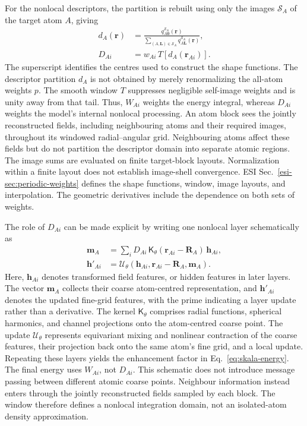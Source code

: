 \documentclass[10pt,a4paper,twocolumn]{article}
\begin{document}
For the nonlocal descriptors, the partition is rebuilt using only the images $\mathcal S_A$ of the target atom $A$, giving
\begin{equation}
 \begin{aligned}
 d_A(\mathbf r)&=\frac{q^{\mathcal S_A}_{A\mathbf0}(\mathbf r)}
 {\sum_{(A,\mathbf L)\in\mathcal S_A}q^{\mathcal S_A}_{A\mathbf L}(\mathbf r)},\\
 D_{Ai}&=w_{Ai}\,T\!\left[d_A(\mathbf r_{Ai})\right].
 \end{aligned}
 \label{eq:descriptor-weights}
\end{equation}
The superscript identifies the centres used to construct the shape functions. The descriptor partition $d_A$ is not obtained by merely renormalizing the all-atom weights $p$. The smooth window $T$ suppresses negligible self-image weights and is unity away from that tail. Thus, $W_{Ai}$ weights the energy integral, whereas $D_{Ai}$ weights the model's internal nonlocal processing. An atom block sees the jointly reconstructed fields, including neighbouring atoms and their required images, throughout its windowed radial--angular grid. Neighbouring atoms affect these fields but do not partition the descriptor domain into separate atomic regions. The image sums are evaluated on finite target-block layouts. Normalization within a finite layout does not establish image-shell convergence. ESI Sec.~\ref{esi-sec:periodic-weights} defines the shape functions, window, image layouts, and interpolation. The geometric derivatives include the dependence on both sets of weights.

The role of $D_{Ai}$ can be made explicit by writing one nonlocal layer schematically as\cite{Skala2025}
\begin{equation}
 \begin{aligned}
 \mathbf m_A&=\sum_i D_{Ai}\,
     \mathsf K_\theta(\mathbf r_{Ai}-\mathbf R_A)\,\mathbf h_{Ai},\\
 \mathbf h'_{Ai}&=\mathcal U_\theta\!\left(
     \mathbf h_{Ai},\mathbf r_{Ai}-\mathbf R_A,\mathbf m_A\right).
 \end{aligned}
 \label{eq:nonlocal-layer}
\end{equation}
Here, $\mathbf h_{Ai}$ denotes transformed field features, or hidden features in later layers. The vector $\mathbf m_A$ collects their coarse atom-centred representation, and $\mathbf h'_{Ai}$ denotes the updated fine-grid features, with the prime indicating a layer update rather than a derivative. The kernel $\mathsf K_\theta$ comprises radial functions, spherical harmonics, and channel projections onto the atom-centred coarse point. The update $\mathcal U_\theta$ represents equivariant mixing and nonlinear contraction of the coarse features, their projection back onto the same atom's fine grid, and a local update. Repeating these layers yields the enhancement factor in Eq.~\eqref{eq:skala-energy}. The final energy uses $W_{Ai}$, not $D_{Ai}$. This schematic does not introduce message passing between different atomic coarse points. Neighbour information instead enters through the jointly reconstructed fields sampled by each block. The window therefore defines a nonlocal integration domain, not an isolated-atom density approximation.
\end{document}
